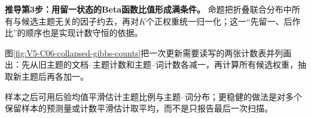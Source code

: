 \documentclass[UTF8,a4paper,11pt,openany]{ctexbook}
\begin{document}
\setcounter{page}{866}
\setcounter{chapter}{35}
\setcounter{section}{2}
\setcounter{figure}{3}
\pagestyle{headings}
\textbf{推导第3步：用留一状态的Beta函数比值形成满条件。}
命题把折叠联合分布中所有与候选主题无关的因子约去，再对$K$个正权重统一归一化；这一“先留一、后作比”的顺序也是实现计数守恒的依据。

图\ref{fig:V5-C06-collapsed-gibbs-counts}把一次更新需要读写的两张计数表并列画出：先从旧主题的文档--主题计数和主题--词计数各减一，再计算所有候选权重，抽取新主题后再各加一。

\FloatBarrier
样本之后可用后验均值平滑估计主题比例与主题--词分布；更稳健的做法是对多个保留样本的预测量或计数平滑估计取平均，而不是只报告最后一次扫描。
\end{document}
